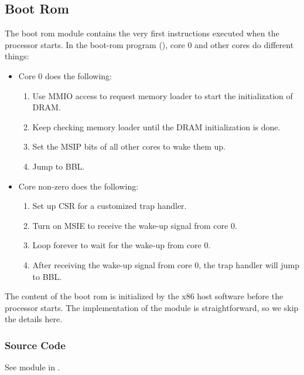 \subsection{Boot Rom}
The boot rom module contains the very first instructions executed when the processor starts.
In the boot-rom program (), core 0 and other cores do different things:
\begin{itemize}
    \item Core 0 does the following:
    \begin{enumerate}
        \item Use MMIO access to request memory loader to start the initialization of DRAM.
        \item Keep checking memory loader until the DRAM initialization is done.
        \item Set the MSIP bits of all other cores to wake them up.
        \item Jump to BBL.
    \end{enumerate}
    \item Core non-zero does the following:
    \begin{enumerate}
        \item Set up  CSR for a customized trap handler.
        \item Turn on MSIE to receive the wake-up signal from core 0.
        \item Loop forever to wait for the wake-up from core 0.
        \item After receiving the wake-up signal from core 0, the trap handler will jump to BBL.
    \end{enumerate}
\end{itemize}
The content of the boot rom is initialized by the x86 host software before the processor starts.
The implementation of the module is straightforward, so we skip the details here.

\subsubsection{Source Code}
See module  in .
